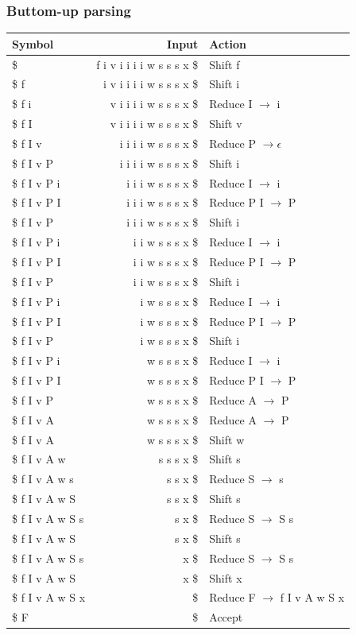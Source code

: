 \documentclass{article}
\begin{document}
\subsubsection{Buttom-up parsing}
\begin{tabular}{|l|r|l|}
\hline
Symbol & Input & Action\\
\hline
\hline
\$ &  f i v i i i i w s s s x \$& Shift f\\
\$ f & i v i i i i w s s s x \$& Shift i\\
\$ f i & v i i i i w s s s x \$& Reduce I $\rightarrow$ i\\
\$ f I & v i i i i w s s s x \$& Shift v\\
\$ f I v & i i i i w s s s x \$& Reduce P $\rightarrow \epsilon$\\
\$ f I v P & i i i i w s s s x \$& Shift i\\
\$ f I v P i & i i i w s s s x \$& Reduce I $\rightarrow$ i\\
\$ f I v P I & i i i w s s s x \$& Reduce P I $\rightarrow$ P\\
\$ f I v P & i i i w s s s x \$& Shift i\\
\$ f I v P i & i i w s s s x \$& Reduce I $\rightarrow$ i\\
\$ f I v P I & i i w s s s x \$& Reduce P I $\rightarrow$ P\\
\$ f I v P & i i w s s s x \$& Shift i\\
\$ f I v P i & i w s s s x \$& Reduce I $\rightarrow$ i\\
\$ f I v P I & i w s s s x \$& Reduce P I $\rightarrow$ P\\
\$ f I v P & i w s s s x \$& Shift i\\
\$ f I v P i & w s s s x \$& Reduce I $\rightarrow$ i\\
\$ f I v P I & w s s s x \$& Reduce P I $\rightarrow$ P\\
\$ f I v P & w s s s x \$& Reduce A $\rightarrow$ P\\
\$ f I v A & w s s s x \$& Reduce A $\rightarrow$ P\\
\$ f I v A & w s s s x \$& Shift w\\
\$ f I v A w & s s s x \$& Shift s\\
\$ f I v A w s & s s x \$& Reduce  S $\rightarrow$ s\\
\$ f I v A w S & s s x \$& Shift s\\
\$ f I v A w S s & s x \$& Reduce  S $\rightarrow$ S s\\
\$ f I v A w S & s x \$& Shift s\\
\$ f I v A w S s & x \$& Reduce  S $\rightarrow$ S s\\
\$ f I v A w S & x \$& Shift x\\
\$ f I v A w S x & \$& Reduce F $\rightarrow$ f I v A w S x \\
\$ F & \$ & Accept \\
\hline
\end{tabular}
\end{document}
